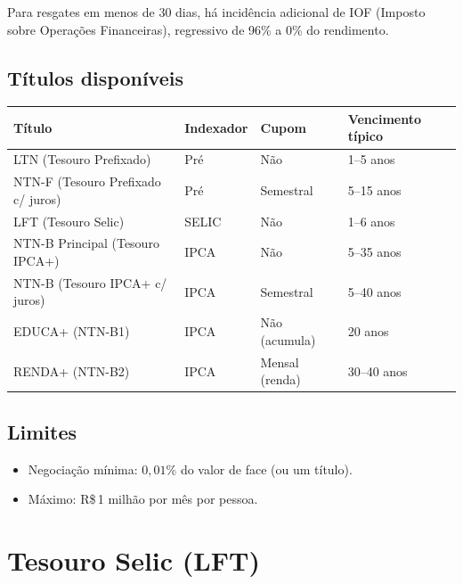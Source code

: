 \begin{nota}
Para resgates em menos de 30 dias, há incidência adicional de IOF (Imposto sobre
Operações Financeiras), regressivo de 96\% a 0\% do rendimento.
\end{nota}

\subsection{Títulos disponíveis}

\begin{center}
\renewcommand{\arraystretch}{1.3}
\begin{tabular}{llll}
\toprule
\textbf{Título} & \textbf{Indexador} & \textbf{Cupom} & \textbf{Vencimento típico} \\
\midrule
LTN (Tesouro Prefixado)        & Pré  & Não  & 1--5 anos \\
NTN-F (Tesouro Prefixado c/ juros) & Pré  & Semestral & 5--15 anos \\
\midrule
LFT (Tesouro Selic)            & SELIC & Não & 1--6 anos \\
NTN-B Principal (Tesouro IPCA+) & IPCA & Não  & 5--35 anos \\
NTN-B (Tesouro IPCA+ c/ juros) & IPCA & Semestral & 5--40 anos \\
EDUCA+ (NTN-B1)                & IPCA & Não (acumula) & 20 anos \\
RENDA+ (NTN-B2)                & IPCA & Mensal (renda)& 30--40 anos \\
\bottomrule
\end{tabular}
\end{center}

\subsection{Limites}

\begin{itemize}
  \item Negociação mínima: $0{,}01\%$ do valor de face (ou um título).
  \item Máximo: R\$\,1 milhão por mês por pessoa.
\end{itemize}

\section{Tesouro Selic (LFT)}

